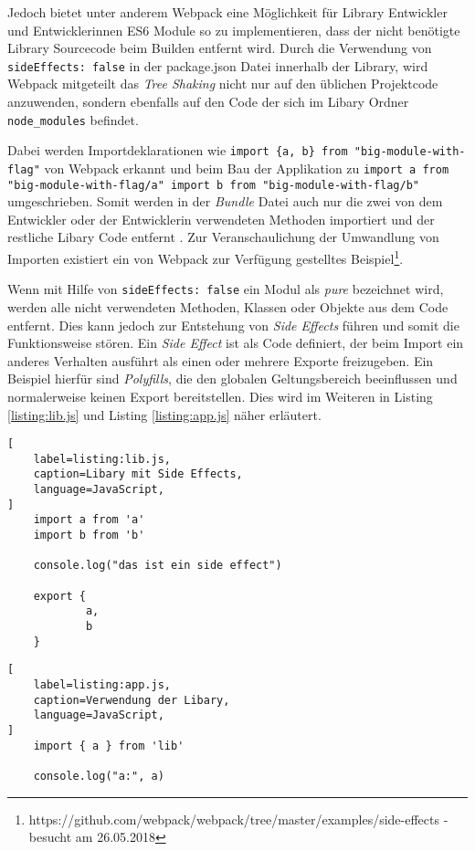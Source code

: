 Jedoch bietet unter anderem Webpack eine Möglichkeit für Library Entwickler und Entwicklerinnen ES6 Module so zu implementieren, dass der nicht benötigte Library Sourcecode beim Builden entfernt wird.
Durch die Verwendung von \lstinline{sideEffects: false} in der package.json Datei innerhalb der Library, wird Webpack mitgeteilt das \textit{Tree Shaking} nicht nur auf den üblichen Projektcode anzuwenden, sondern ebenfalls auf den Code der sich im Libary Ordner \lstinline{node_modules} befindet.

Dabei werden Importdeklarationen wie \lstinline|import {a, b} from "big-module-with-flag"| von Webpack erkannt und beim Bau der Applikation zu \lstinline|import a from "big-module-with-flag/a" import b from "big-module-with-flag/b"| umgeschrieben. Somit werden in der \textit{Bundle} Datei auch nur die zwei von dem Entwickler oder der Entwicklerin verwendeten Methoden importiert und der restliche Libary Code entfernt \autocite{WebpackTreeShaking}. Zur Veranschaulichung der Umwandlung von Importen existiert ein von Webpack zur Verfügung gestelltes Beispiel\footnote{https://github.com/webpack/webpack/tree/master/examples/side-effects - besucht am 26.05.2018}. 

Wenn mit Hilfe von \lstinline{sideEffects: false} ein Modul als \textit{pure} bezeichnet wird, werden alle nicht verwendeten Methoden, Klassen oder Objekte aus dem Code entfernt. Dies kann jedoch zur Entstehung von \textit{Side Effects} führen und somit die Funktionsweise stören. Ein \textit{Side Effect} ist als Code definiert, der beim Import ein anderes Verhalten ausführt als einen oder mehrere Exporte freizugeben. Ein Beispiel hierfür sind \textit{Polyfills}, die den globalen Geltungsbereich beeinflussen und normalerweise keinen Export bereitstellen. Dies wird im Weiteren in Listing \ref{listing:lib.js} und Listing \ref{listing:app.js} näher erläutert.

\begin{lstlisting}[
    label=listing:lib.js,
	caption=Libary mit Side Effects,
	language=JavaScript,
]
	import a from 'a'
    import b from 'b'
    
    console.log("das ist ein side effect")
    
    export {
    		a,
    		b
    }
\end{lstlisting}

\begin{lstlisting}[
    label=listing:app.js,
	caption=Verwendung der Libary,
	language=JavaScript,
]
	import { a } from 'lib'
    
    console.log("a:", a)
\end{lstlisting}

